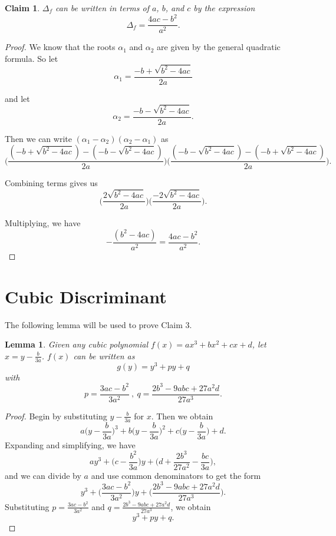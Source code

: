 \documentclass[12pt]{amsart}
\newtheorem{lem}{Lemma}
\newtheorem{clm}{Claim}
\theoremstyle{case}
\begin{document}
	\begin{clm}
		$\Delta_f$ can be written in terms of $a$, $b$, and $c$ by the expression
		$$ \Delta_f = \frac{4ac - b^2}{a^2} . $$
	\end{clm}
	
	\begin{proof}
		We know that the roots $\alpha_1$ and $\alpha_2$ are given by the general quadratic formula. So let
		$$ \alpha_1 = \frac{-b + \sqrt{b^2 - 4ac}}{2a} $$
		
		and let
		$$ \alpha_2 = \frac{-b - \sqrt{b^2 - 4ac}}{2a} . $$
		
		Then we can write $(\alpha_1 - \alpha_2)(\alpha_2 - \alpha_1)$ as
		$$ \bigg( \frac{(-b + \sqrt{b^2 - 4ac})-(-b - \sqrt{b^2 - 4ac})}{2a} \bigg) \bigg( \frac{(-b - \sqrt{b^2 - 4ac})-(-b + \sqrt{b^2 - 4ac})}{2a} \bigg) . $$
		
		Combining terms gives us
		$$ \bigg( \frac{2\sqrt{b^2 - 4ac}}{2a} \bigg) \bigg( \frac{-2\sqrt{b^2 - 4ac}}{2a} \bigg) . $$
		
		Multiplying, we have
		$$ - \frac{(b^2 - 4ac)}{a^2} = \frac{4ac - b^2}{a^2} . $$
	\end{proof}

	\section{Cubic Discriminant}

	The following lemma will be used to prove Claim 3.

	\begin{lem}
		\label{depressed}
		Given any cubic polynomial $f(x) = ax^3 + bx^2 + cx + d$, let $x = y - \frac{b}{3a}$. $f(x)$ can be written as
		$$ g(y) = y^3 + py + q $$
		with
		$$ p = \frac{3ac-b^2}{3a^2} \ , \ q = \frac{2b^3 - 9abc + 27a^2d}{27a^3} . $$
	\end{lem}
	
	\begin{proof}
		Begin by substituting $y-\frac{b}{3a}$ for $x$. Then we obtain
		$$ a \Big( y-\frac{b}{3a} \Big)^3 + b\Big( y-\frac{b}{3a} \Big)^2 + c \Big( y-\frac{b}{3a} \Big) + d . $$
		Expanding and simplifying, we have
		$$ ay^3 + \Big( c - \frac{b^2}{3a} \Big) y + \Big(d + \frac{2b^3}{27a^2} - \frac{bc}{3a} \Big) , $$
		and we can divide by $a$ and use common denominators to get the form
		$$ y^3 + \Big( \frac{3ac-b^2}{3a^2} \Big) y + \Big( \frac{2b^3 - 9abc + 27a^2d}{27a^3} \Big) . $$
		Substituting $p = \frac{3ac-b^2}{3a^2}$ and $q = \frac{2b^3 - 9abc + 27a^2d}{27a^3}$, we obtain
		$$ y^3 + py + q . $$		
	\end{proof}
\end{document}
